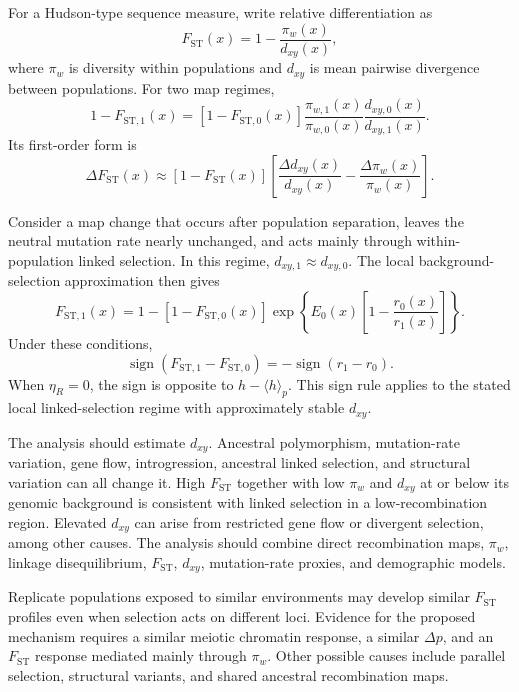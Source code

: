 \documentclass[11pt]{article}
\theoremstyle{remark}
\newcommand{\avg}[1]{\langle #1 \rangle}
\newcommand{\FST}{F_{\mathrm{ST}}}
\newcommand{\dxy}{d_{xy}}
\begin{document}
For a Hudson-type sequence measure, write relative differentiation as
\begin{equation}
\FST(x)=1-\frac{\pi_w(x)}{\dxy(x)},
\label{eq:fst_def}
\end{equation}
where $\pi_w$ is diversity within populations and $\dxy$ is mean pairwise
divergence between populations. For two map regimes,
\begin{equation}
\boxed{\;
1-F_{\mathrm{ST},1}(x)
=\left[1-F_{\mathrm{ST},0}(x)\right]
\frac{\pi_{w,1}(x)}{\pi_{w,0}(x)}
\frac{d_{xy,0}(x)}{d_{xy,1}(x)}.
\;}
\label{eq:fst_finite}
\end{equation}
Its first-order form is
\begin{equation}
\Delta\FST(x)
\approx
\left[1-\FST(x)\right]
\left[
\frac{\Delta\dxy(x)}{\dxy(x)}
-
\frac{\Delta\pi_w(x)}{\pi_w(x)}
\right].
\label{eq:fst_firstorder}
\end{equation}

Consider a map change that occurs after population separation, leaves the neutral
mutation rate nearly unchanged, and acts mainly through within-population linked
selection. In this regime, $d_{xy,1}\approx d_{xy,0}$. The local
background-selection approximation then gives
\begin{equation}
\boxed{\;
F_{\mathrm{ST},1}(x)
=1-\left[1-F_{\mathrm{ST},0}(x)\right]
\exp\!\left\{
E_0(x)\left[1-\frac{r_0(x)}{r_1(x)}\right]
\right\}.
\;}
\label{eq:fst_local}
\end{equation}
Under these conditions,
\begin{equation}
\operatorname{sign}\!\left(F_{\mathrm{ST},1}-F_{\mathrm{ST},0}\right)
=-\operatorname{sign}(r_1-r_0).
\label{eq:fst_sign}
\end{equation}
When $\eta_R=0$, the sign is opposite to $h-\avg{h}_p$. This sign rule applies to
the stated local linked-selection regime with approximately stable $\dxy$.

The analysis should estimate $\dxy$. Ancestral polymorphism, mutation-rate
variation, gene flow, introgression, ancestral linked selection, and structural
variation can all change it. High $\FST$ together with low $\pi_w$ and $\dxy$ at or below its genomic
background is consistent with linked selection in a low-recombination region.
Elevated $\dxy$ can arise from restricted gene flow or divergent selection, among
other causes. The analysis should combine direct recombination maps, $\pi_w$, linkage
disequilibrium, $\FST$, $\dxy$, mutation-rate proxies, and demographic models.

Replicate populations exposed to similar environments may develop similar $\FST$
profiles even when selection acts on different loci. Evidence for the proposed
mechanism requires a similar meiotic chromatin response, a similar $\Delta p$, and
an $\FST$ response mediated mainly through $\pi_w$. Other possible causes include
parallel selection, structural variants, and shared ancestral recombination maps.
\end{document}

